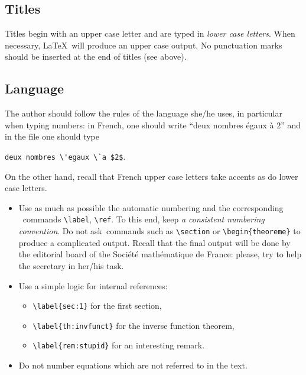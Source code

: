 \documentclass[10 pt,english]{smfart}
\newcommand{\SmF}{Soci\'et\'e ma\-th\'e\-ma\-ti\-que de France}
\begin{document}
\subsection{Titles}

Titles begin with an upper case letter and are typed in {\em lower case letters}.
When necessary, \LaTeX\ will produce an upper case output.
No punctuation marks should be inserted at the end of titles (see above).

\subsection{Language}

The author should follow the rules of the language she/he uses, in particular when typing numbers:
in French, one should write ``deux nombres \'egaux \`a $2$'' and in the file one should type

\verb|deux nombres \'egaux \`a $2$|.

\noindent
On the other hand, recall that French upper case letters take accents as do lower case letters.


\begin{itemize}
\item
Use as much as possible the automatic numbering and the corresponding \LaTeXe\ commands \verb|\label|, \verb|\ref|. To this end, keep {\em a consistent numbering convention}. Do not \og ask\fg\ commands such as
\verb|\section| or \verb|\begin{theoreme}| to produce a complicated output. Recall that the final output will be done by the editorial board of the \SmF: please, try to help the secretary in her/his task.

\item
Use a simple logic for internal references:
\begin{itemize}
\item
\verb|\label{sec:1}| for the first section,

\item
\verb|\label{th:invfunct}| for the inverse function theorem,

\item
\verb|\label{rem:stupid}| for an interesting remark.
\end{itemize}

\item
Do not number equations which are not referred to in the text.
\end{itemize}
\end{document}
